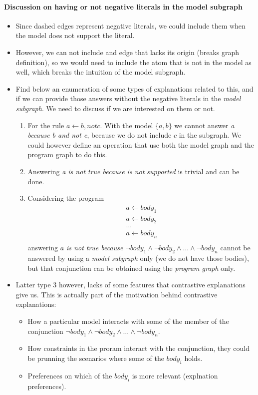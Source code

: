 \paragraph{Discussion on having or not negative literals in the model subgraph}
  \begin{itemize}
    \item Since dashed edges represent negative literals, we could include them when the model does not support the literal.
    \item However, we can not include and edge that lacks its origin (breaks graph definition), so we would need to include the atom that is not in the model as well, which breaks the intuition of the model subgraph.
    \item Find below an enumeration of some types of explanations related to this, and if we can provide those answers without the negative literals in the \emph{model subgraph}. We need to discuss if we are interested on them or not.
    \begin{enumerate}
      \item For the rule $a \leftarrow b, not c$. With the model $\{ a, b\}$ we cannot answer \emph{a because b and not c}, because we do not include $c$ in the subgraph. We could however define an operation that use both the model graph and the program graph to do this.
      \item Answering \emph{a is not true because is not supported} is trivial and can be done.
      \item Considering the program
      \[
      \begin{array}{c}
        a \leftarrow body_1 \\
        a \leftarrow body_2 \\
        \dots               \\
        a \leftarrow body_n \\
      \end{array}
      \]
      answering \emph{$a$ is not true because $\neg body_1 \land \neg body_2 \land \dots \land \neg body_n$} cannot be answered by using a \emph{model subgraph} only (we do not have those bodies), but that conjunction can be obtained using the \emph{program graph} only.
    \end{enumerate}
    \item Latter type 3 however, lacks of some features that contrastive explanations give us. This is actually part of the motivation behind contrastive explanations:
    \begin{itemize}
      \item How a particular model interacts with some of the member of the conjunction $\neg body_1 \land \neg body_2 \land \dots \land \neg body_n$.
      \item How constraints in the proram interact with the conjunction, they could be prunning the scenarios where some of the $body_i$ holds.
      \item Preferences on which of the $body_i$ is more relevant (explnation preferences).
    \end{itemize}
  \end{itemize}

